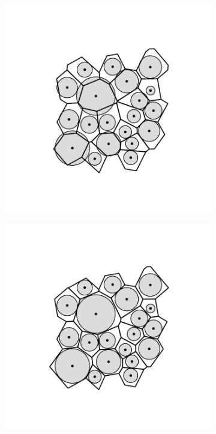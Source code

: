 \begin{figure}[b]
     \centering
     
     \begin{subfigure}[b]{0.22\textwidth}
         \centering
         \includegraphics[width=\textwidth]{./figures/methods/voro_demo_vw.pdf}
         \caption{}
         \label{fig:vorodemov1}
     \end{subfigure}
     \hfill
     \begin{subfigure}[b]{0.22\textwidth}
         \centering
         \includegraphics[width=\textwidth]{./figures/methods/voro_demo_rw.pdf}

\end{subfigure}
\end{figure}
